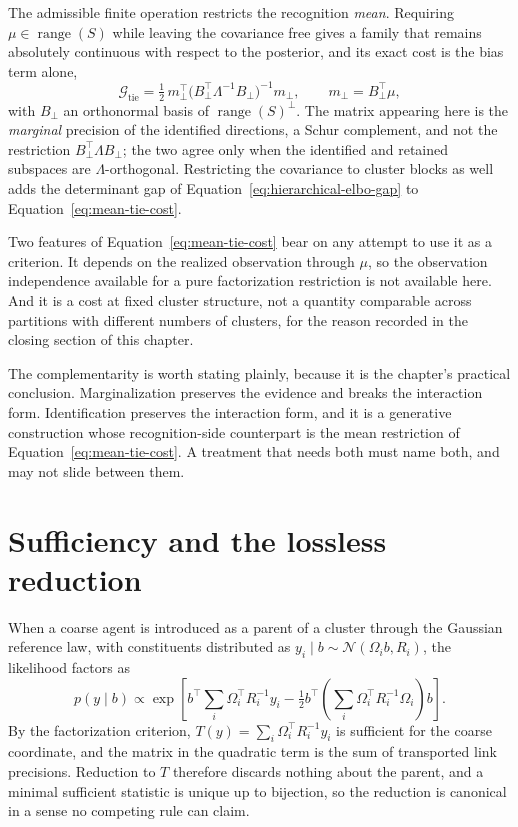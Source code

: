 The admissible finite operation restricts the recognition \emph{mean}. Requiring \(\mu\in\operatorname{range}(S)\) while leaving the covariance free gives a family that remains absolutely continuous with respect to the posterior, and its exact cost is the bias term alone,
\begin{equation}
\mathcal G_{\mathrm{tie}}
=\tfrac12\,m_\perp^{\top}
\bigl(B_\perp^{\top}\Lambda^{-1}B_\perp\bigr)^{-1}
m_\perp,
\qquad
m_\perp=B_\perp^{\top}\mu,
\label{eq:mean-tie-cost}
\end{equation}
with \(B_\perp\) an orthonormal basis of \(\operatorname{range}(S)^{\perp}\). The matrix appearing here is the \emph{marginal} precision of the identified directions, a Schur complement, and not the restriction \(B_\perp^{\top}\Lambda B_\perp\); the two agree only when the identified and retained subspaces are \(\Lambda\)-orthogonal. Restricting the covariance to cluster blocks as well adds the determinant gap of Equation~\eqref{eq:hierarchical-elbo-gap} to Equation~\eqref{eq:mean-tie-cost}.

Two features of Equation~\eqref{eq:mean-tie-cost} bear on any attempt to use it as a criterion. It depends on the realized observation through \(\mu\), so the observation independence available for a pure factorization restriction is not available here. And it is a cost at fixed cluster structure, not a quantity comparable across partitions with different numbers of clusters, for the reason recorded in the closing section of this chapter.

The complementarity is worth stating plainly, because it is the chapter's practical conclusion. Marginalization preserves the evidence and breaks the interaction form. Identification preserves the interaction form, and it is a generative construction whose recognition-side counterpart is the mean restriction of Equation~\eqref{eq:mean-tie-cost}. A treatment that needs both must name both, and may not slide between them.

\section{Sufficiency and the lossless reduction}

When a coarse agent is introduced as a parent of a cluster through the Gaussian reference law, with constituents distributed as \(y_i\mid b\sim\mathcal N(\Omega_i b,R_i)\), the likelihood factors as
\begin{equation}
p(y\mid b)
\propto
\exp\left[
b^{\top}\sum_i\Omega_i^{\top}R_i^{-1}y_i
-\tfrac12 b^{\top}\left(\sum_i\Omega_i^{\top}R_i^{-1}\Omega_i\right)b
\right].
\label{eq:coarse-sufficient-statistic}
\end{equation}
By the factorization criterion, \(T(y)=\sum_i\Omega_i^{\top}R_i^{-1}y_i\) is sufficient for the coarse coordinate, and the matrix in the quadratic term is the sum of transported link precisions. Reduction to \(T\) therefore discards nothing about the parent, and a minimal sufficient statistic is unique up to bijection, so the reduction is canonical in a sense no competing rule can claim.


